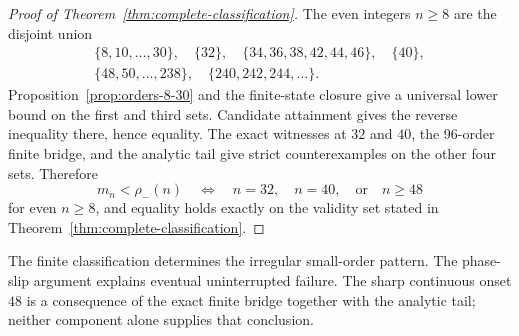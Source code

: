 \begin{proof}[Proof of Theorem~\ref{thm:complete-classification}]
The even integers \(n\geq8\) are the disjoint union
\[
\begin{gathered}
\{8,10,\ldots,30\},\quad\{32\},\quad
\{34,36,38,42,44,46\},\quad\{40\},\\
\{48,50,\ldots,238\},\quad
\{240,242,244,\ldots\}.
\end{gathered}
\]
Proposition~\ref{prop:orders-8-30} and the finite-state closure give a
universal lower bound on the first and third sets.  Candidate attainment
gives the reverse inequality there, hence equality.  The exact witnesses at
\(32\) and \(40\), the 96-order finite bridge, and the analytic tail give
strict counterexamples on the other four sets.  Therefore
\[
m_n<\rho_-(n)
\quad\Longleftrightarrow\quad
n=32,\quad n=40,\quad\text{or}\quad n\geq48
\]
for even \(n\geq8\), and equality holds exactly on the validity set stated
in Theorem~\ref{thm:complete-classification}.
\end{proof}

The finite classification determines the irregular small-order pattern.
The phase-slip argument explains eventual uninterrupted failure.  The sharp
continuous onset \(48\) is a consequence of the exact finite bridge together
with the analytic tail; neither component alone supplies that conclusion.
